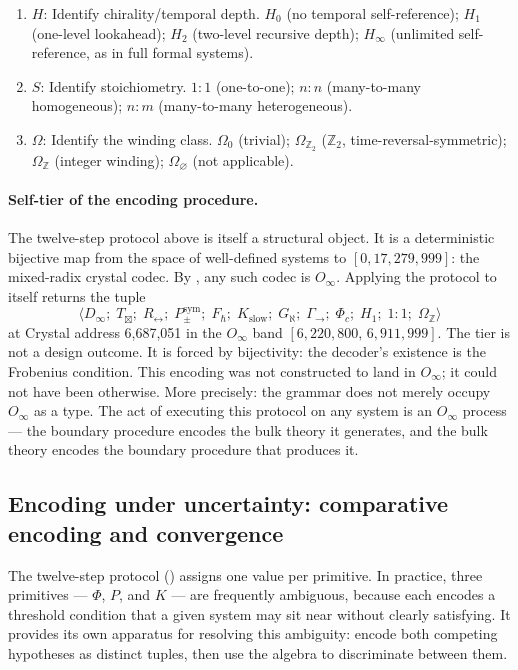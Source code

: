 \documentclass[12pt,a4paper]{article}
\newcommand{\Phic}{\Phi_c}
\newcommand{\Ppms}{P_{\pm}^{\text{sym}}}
\newcommand{\Oinf}{O_\infty}
\newcommand{\OmegaZ}{\Omega_{\mathbb{Z}}}
\newcommand{\OmegaZtwo}{\Omega_{\mathbb{Z}_2}}
\newcommand{\GamSeq}{\Gamma_{\to}}
\newcommand{\Tbox}{T_{\mathord{\boxtimes}}}
\begin{document}
\begin{enumerate}[noitemsep]
    $\Phic^\mathbb{C}$ (complex criticality); $\Phi_\uparrow$
    (supercritical).
  \item \textbf{$H$}: Identify chirality/temporal depth.
    $H_0$ (no temporal self-reference); $H_1$ (one-level lookahead);
    $H_2$ (two-level recursive depth); $H_\infty$ (unlimited
    self-reference, as in full formal systems).
  \item \textbf{$S$}: Identify stoichiometry.
    $1{:}1$ (one-to-one); $n{:}n$ (many-to-many homogeneous);
    $n{:}m$ (many-to-many heterogeneous).
  \item \textbf{$\Omega$}: Identify the winding class.
    $\Omega_0$ (trivial); $\OmegaZtwo$ ($\mathbb{Z}_2$,
    time-reversal-symmetric); $\OmegaZ$ (integer winding);
    $\Omega_\varnothing$ (not applicable).
\end{enumerate}

\paragraph{Self-tier of the encoding procedure.}
The twelve-step protocol above is itself a structural object. It is a
deterministic bijective map from the space of well-defined systems to
$[0, 17{,}279{,}999]$: the mixed-radix crystal codec. By
, any such codec is $\Oinf$. Applying the protocol
to itself returns the tuple
\[
  \langle D_\infty;\; \Tbox;\; R_\leftrightarrow;\; \Ppms;\;
  F_\hbar;\; K_\text{slow};\; G_\aleph;\; \GamSeq;\; \Phic;\;
  H_1;\; 1{:}1;\; \OmegaZ \rangle
\]
at Crystal address 6,687,051 in the $\Oinf$ band $[6{,}220{,}800,\, 6{,}911{,}999]$.
The tier is not a design outcome. It is forced by bijectivity: the decoder's
existence is the Frobenius condition. This encoding was not constructed to
land in $\Oinf$; it could not have been otherwise. More precisely: the
grammar does not merely occupy $\Oinf$ as a type. The act of executing
this protocol on any system is an $\Oinf$ process --- the boundary
procedure encodes the bulk theory it generates, and the bulk theory
encodes the boundary procedure that produces it.

\subsection{Encoding under uncertainty: comparative encoding and convergence}
\label{sec:encoding_epistemology}

The twelve-step protocol () assigns one value per
primitive. In practice, three primitives --- $\Phi$, $P$, and $K$
--- are frequently ambiguous, because each encodes a threshold
condition that a given system may sit near without clearly satisfying.
It provides its own apparatus for resolving this ambiguity:
encode both competing hypotheses as distinct tuples, then use the
algebra to discriminate between them.
\end{document}
